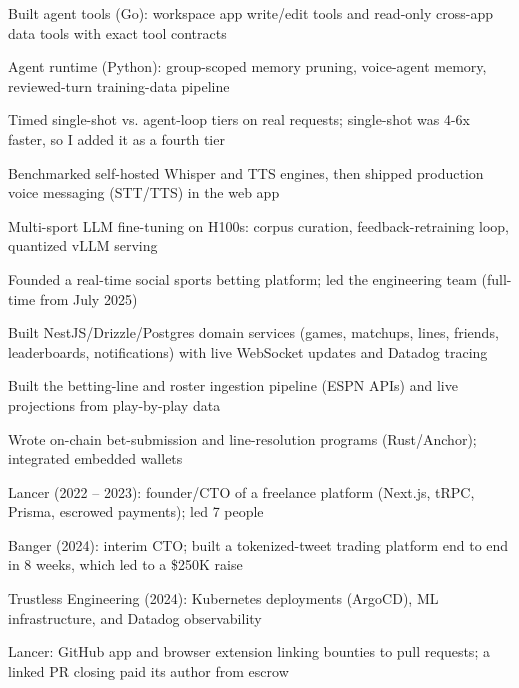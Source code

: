 \documentclass[print]{jack-resume}
\begin{document}
\begin{tightemize}
    \item Built agent tools (Go): workspace app write/edit tools and read-only cross-app data tools with exact tool contracts
    \item Agent runtime (Python): group-scoped memory pruning, voice-agent memory, reviewed-turn training-data pipeline
    \item Timed single-shot vs. agent-loop tiers on real requests; single-shot was 4-6x faster, so I added it as a fourth tier
    \item Benchmarked self-hosted Whisper and TTS engines, then shipped production voice messaging (STT/TTS) in the web app
    \item Multi-sport LLM fine-tuning on H100s: corpus curation, feedback-retraining loop, quantized vLLM serving
\end{tightemize}
\sectionsep

\begin{tightemize}
    \item Founded a real-time social sports betting platform; led the engineering team (full-time from July 2025)
    \item Built NestJS/Drizzle/Postgres domain services (games, matchups, lines, friends, leaderboards, notifications) with live WebSocket updates and Datadog tracing
    \item Built the betting-line and roster ingestion pipeline (ESPN APIs) and live projections from play-by-play data
    \item Wrote on-chain bet-submission and line-resolution programs (Rust/Anchor); integrated embedded wallets
\end{tightemize}
\sectionsep

\begin{tightemize}
    \item Lancer (2022 -- 2023): founder/CTO of a freelance platform (Next.js, tRPC, Prisma, escrowed payments); led 7 people
    \item Banger (2024): interim CTO; built a tokenized-tweet trading platform end to end in 8 weeks, which led to a \$250K raise
    \item Trustless Engineering (2024): Kubernetes deployments (ArgoCD), ML infrastructure, and Datadog observability
    \item Lancer: GitHub app and browser extension linking bounties to pull requests; a linked PR closing paid its author from escrow
\end{tightemize}
\sectionsep
\end{document}
